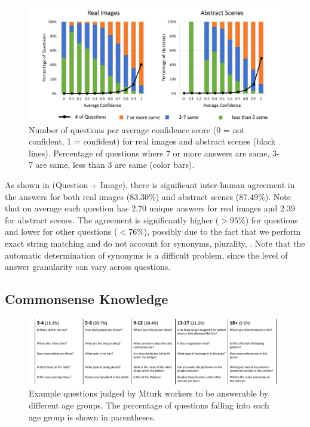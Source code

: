 \begin{figure}[t]
\centering
\includegraphics[width=1\linewidth]{figures/Confidence.pdf}
\caption{Number of questions per average confidence score (0 = not confident, 1 = confident) for real images and abstract scenes (black lines). Percentage of questions where 7 or more answers are same, 3-7 are same, less than 3 are same (color bars). }
\label{fig:ConfScores}
\end{figure}

As shown in  (Question + Image), there is significant inter-human
agreement in the answers for both real images ($83.30\%$) and abstract scenes ($87.49\%$). 
Note that on average each question has $2.70$ unique answers for real images and $2.39$ for abstract scenes. 
The agreement is significantly higher ($>95\%$) for  questions and lower for other questions ($<76\%$), possibly due to the fact that we perform exact string matching and do not account for synonyms, plurality, \etc. Note that the automatic determination of synonyms is a difficult problem, since the level of answer granularity can vary across questions.




\subsection{Commonsense Knowledge}
\label{sec:cs}
\begin{figure}[t]
 \includegraphics[width=\linewidth]{figures/age.pdf}
 \centering
\caption{\small Example questions judged by Mturk workers to be answerable by different age groups. The percentage of questions falling into each age group is shown in parentheses.}
 \label{fig:age}
 \end{figure}
 	
